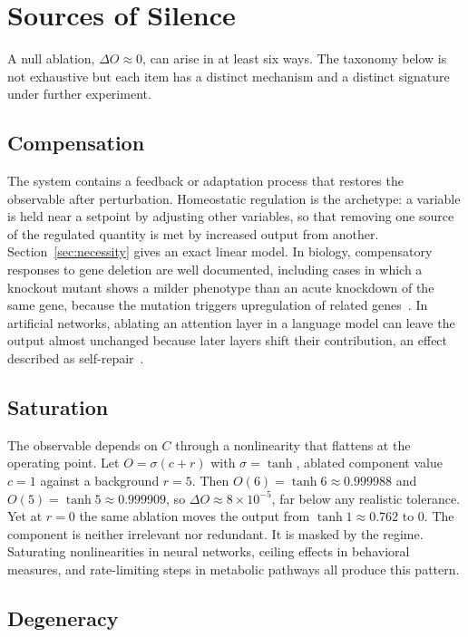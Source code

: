 \documentclass[11pt]{article}
\theoremstyle{definition}
\theoremstyle{remark}
\begin{document}
\section{Sources of Silence}\label{sec:silence}

A null ablation, $\Delta O\approx 0$, can arise in at least six ways. The taxonomy below is not exhaustive but each item has a distinct mechanism and a distinct signature under further experiment.

\subsection{Compensation}

The system contains a feedback or adaptation process that restores the observable after perturbation. Homeostatic regulation is the archetype: a variable is held near a setpoint by adjusting other variables, so that removing one source of the regulated quantity is met by increased output from another. Section~\ref{sec:necessity} gives an exact linear model. In biology, compensatory responses to gene deletion are well documented, including cases in which a knockout mutant shows a milder phenotype than an acute knockdown of the same gene, because the mutation triggers upregulation of related genes~\cite{rossi2015,elbrolosy2019}. In artificial networks, ablating an attention layer in a language model can leave the output almost unchanged because later layers shift their contribution, an effect described as self-repair~\cite{mcgrath2023}.

\subsection{Saturation}

The observable depends on $C$ through a nonlinearity that flattens at the operating point. Let $O=\sigma(c+r)$ with $\sigma=\tanh$, ablated component value $c=1$ against a background $r=5$. Then $O(6)=\tanh 6\approx 0.999988$ and $O(5)=\tanh 5\approx 0.999909$, so $\Delta O\approx 8\times 10^{-5}$, far below any realistic tolerance. Yet at $r=0$ the same ablation moves the output from $\tanh 1\approx 0.762$ to $0$. The component is neither irrelevant nor redundant. It is masked by the regime. Saturating nonlinearities in neural networks, ceiling effects in behavioral measures, and rate-limiting steps in metabolic pathways all produce this pattern.

\subsection{Degeneracy}
\end{document}

